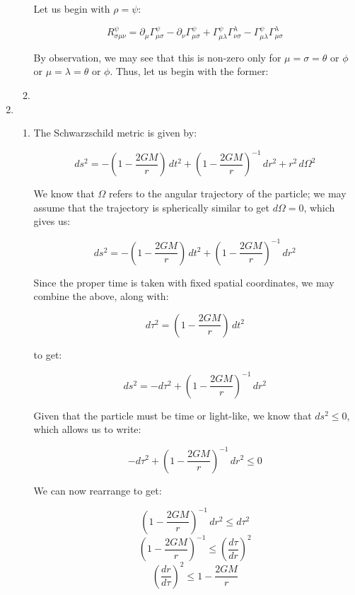 \begin{enumerate}
\begin{enumerate}
        Let us begin with $\rho=\psi$:

        $$R^{\psi}_{\sigma\mu\nu}=\partial_{\mu}\Gamma^{\psi}_{\mu\sigma}-\partial_{\nu}\Gamma^{\psi}_{\mu\sigma}+\Gamma^{\psi}_{\mu\lambda}\Gamma^{\lambda}_{\nu\sigma}-\Gamma^{\psi}_{\mu\lambda}\Gamma^{\lambda}_{\mu\sigma}$$

        By observation, we may see that this is non-zero only for $\mu=\sigma=\theta\text{ or }\phi$ or $\mu=\lambda=\theta\text{ or }\phi$. Thus, let us begin with the former:

      \item 

    \end{enumerate}

  \item

    \begin{enumerate}

      \item 

        The Schwarzschild metric is given by:

        $$ds^2=-\left( 1-\frac{2GM}{r} \right)\,dt^2+\left( 1-\frac{2GM}{r} \right)^{-1}\,dr^2+r^2\,d\Omega^2$$

        We know that $\Omega$ refers to the angular trajectory of the particle; we may assume that the trajectory is spherically similar to get $d\Omega=0$, which gives us:

        $$ds^2=-\left( 1-\frac{2GM}{r} \right)\,dt^2+\left( 1-\frac{2GM}{r} \right)^{-1}\,dr^2$$

        Since the proper time is taken with fixed spatial coordinates, we may combine the above, along with:

        $$d\tau^2=\left( 1-\frac{2GM}{r} \right)\,dt^2$$

        to get:

        $$ds^2=-d\tau^2+\left( 1-\frac{2GM}{r} \right)^{-1}\,dr^2$$

        Given that the particle must be time or light-like, we know that $ds^2\leq 0$, which allows us to write:

        $$-d\tau^2+\left( 1-\frac{2GM}{r} \right)^{-1}\,dr^2\leq 0$$

        We can now rearrange to get:

        $$\left( 1-\frac{2GM}{r} \right)^{-1}\,dr^2\leq d\tau^2$$
        $$\left( 1-\frac{2GM}{r} \right)^{-1}\leq \left(\frac{d\tau}{dr}\right)^2$$
        $$\left(\frac{dr}{d\tau}\right)^2\leq 1-\frac{2GM}{r}$$


\end{enumerate}
\end{enumerate}
